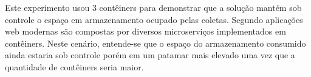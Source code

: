 Este experimento usou 3 contêiners para demonstrar que a solução mantém sob controle o espaço em armazenamento ocupado pelas coletas. 
%
Segundo \cite{StubbsConteinersNumberMicroServices:2015} aplicações web modernas são compostas por diversos microserviços implementados em contêiners.
%
Neste cenário, entende-se que o espaço do armazenamento consumido ainda estaria sob controle porém em um patamar mais elevado uma vez que a quantidade de contêiners seria maior.
%


